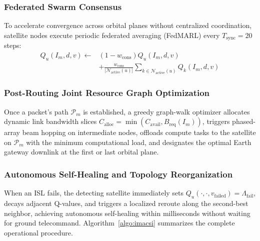 \documentclass[journal]{IEEEtran}
\begin{document}
\subsubsection{Federated Swarm Consensus}
To accelerate convergence across orbital planes without centralized coordination, satellite nodes execute periodic federated averaging (FedMARL) every $T_{\text{sync}} = 20$ steps:
\begin{equation}
\begin{split}
Q_u(I_m, d, v) \leftarrow & (1 - w_{\text{cons}}) Q_u(I_m, d, v) \\
& + \frac{w_{\text{cons}}}{|\mathcal{N}_{\text{active}}(u)|} \sum_{k \in \mathcal{N}_{\text{active}}(u)} Q_k(I_m, d, v)
\end{split}
\label{eq:consensus}
\end{equation}

\subsubsection{Post-Routing Joint Resource Graph Optimization}
Once a packet's path $\mathcal{P}_m$ is established, a greedy graph-walk optimizer allocates dynamic link bandwidth slices $C_{\text{alloc}} = \min(C_{\text{avail}}, B_{\text{req}}(I_m))$, triggers phased-array beam hopping on intermediate nodes, offloads compute tasks to the satellite on $\mathcal{P}_m$ with the minimum computational load, and designates the optimal Earth gateway downlink at the first or last orbital plane.

\subsubsection{Autonomous Self-Healing and Topology Reorganization}
When an ISL fails, the detecting satellite immediately sets $Q_u(\cdot, \cdot, v_{\text{failed}}) = \Lambda_{\text{fail}}$, decays adjacent Q-values, and triggers a localized reroute along the second-best neighbor, achieving autonomous self-healing within milliseconds without waiting for ground telecommand. Algorithm~\ref{algo:imacsi} summarizes the complete operational procedure.
\end{document}
